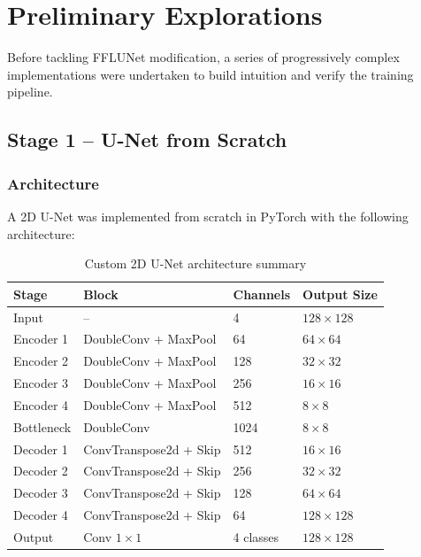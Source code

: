 \documentclass[12pt,a4paper]{report}
\begin{document}
\chapter{Preliminary Explorations}

Before tackling FFLUNet modification, a series of progressively complex implementations were undertaken to build intuition and verify the training pipeline.

\section{Stage 1 -- U-Net from Scratch}

\subsection{Architecture}

A 2D U-Net was implemented from scratch in PyTorch with the following architecture:

\begin{table}[H]
\centering
\caption{Custom 2D U-Net architecture summary}
\label{tab:unet_arch}
\begin{tabular}{llll}
\toprule
\textbf{Stage} & \textbf{Block} & \textbf{Channels} & \textbf{Output Size} \\
\midrule
Input & -- & 4 & $128 \times 128$ \\
Encoder 1 & DoubleConv + MaxPool & 64 & $64 \times 64$ \\
Encoder 2 & DoubleConv + MaxPool & 128 & $32 \times 32$ \\
Encoder 3 & DoubleConv + MaxPool & 256 & $16 \times 16$ \\
Encoder 4 & DoubleConv + MaxPool & 512 & $8 \times 8$ \\
Bottleneck & DoubleConv & 1024 & $8 \times 8$ \\
Decoder 1 & ConvTranspose2d + Skip & 512 & $16 \times 16$ \\
Decoder 2 & ConvTranspose2d + Skip & 256 & $32 \times 32$ \\
Decoder 3 & ConvTranspose2d + Skip & 128 & $64 \times 64$ \\
Decoder 4 & ConvTranspose2d + Skip & 64 & $128 \times 128$ \\
Output & Conv $1 \times 1$ & 4 classes & $128 \times 128$ \\
\bottomrule
\end{tabular}
\end{table}
\end{document}

